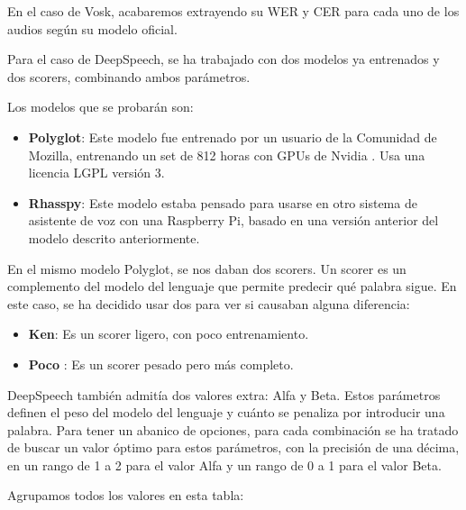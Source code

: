 En el caso de Vosk, acabaremos extrayendo su WER y CER para cada uno de los audios según su modelo oficial.

Para el caso de DeepSpeech, se ha trabajado con dos modelos ya entrenados y dos scorers, combinando ambos parámetros.

Los modelos que se probarán son:
\begin{itemize}
	\item \textbf{Polyglot}: Este modelo fue entrenado por un usuario de la Comunidad de Mozilla, entrenando un set de 812 horas con GPUs de Nvidia \cite{scribosermo}. Usa una licencia LGPL versión 3.
	\item \textbf{Rhasspy}: Este modelo estaba pensado para usarse en otro sistema de asistente de voz con una Raspberry Pi, basado en una versión anterior del modelo descrito anteriormente.
\end{itemize}

En el mismo modelo Polyglot, se nos daban dos scorers. Un scorer es un complemento del modelo del lenguaje que permite predecir qué palabra sigue. En este caso, se ha decidido usar dos para ver si causaban alguna diferencia:

\begin{itemize}
	\item \textbf{Ken}: Es un scorer ligero, con poco entrenamiento.
	\item \textbf{Poco} : Es un scorer pesado pero más completo.
\end{itemize} 

DeepSpeech también admitía dos valores extra: Alfa y Beta. Estos parámetros definen el peso del modelo del lenguaje y cuánto se penaliza por introducir una palabra. Para tener un abanico de opciones, para cada combinación se ha tratado de buscar un valor óptimo para estos parámetros, con la precisión de una décima, en un rango de 1 a 2 para el valor Alfa y un rango de 0 a 1 para el valor Beta.

Agrupamos todos los valores en esta tabla:


